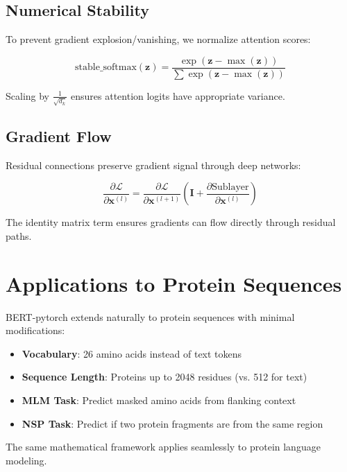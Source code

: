 \documentclass[11pt,a4paper]{article}
\begin{document}
\subsection{Numerical Stability}

To prevent gradient explosion/vanishing, we normalize attention scores:

\begin{equation}
\text{stable\_softmax}(\mathbf{z}) = \frac{\exp(\mathbf{z} - \max(\mathbf{z}))}{\sum \exp(\mathbf{z} - \max(\mathbf{z}))}
\end{equation}

Scaling by $\frac{1}{\sqrt{d_k}}$ ensures attention logits have appropriate variance.

\subsection{Gradient Flow}

Residual connections preserve gradient signal through deep networks:

\begin{equation}
\frac{\partial \mathcal{L}}{\partial \mathbf{x}^{(l)}} = \frac{\partial \mathcal{L}}{\partial \mathbf{x}^{(l+1)}} \left(\mathbf{I} + \frac{\partial \text{Sublayer}}{\partial \mathbf{x}^{(l)}}\right)
\end{equation}

The identity matrix term ensures gradients can flow directly through residual paths.

\section{Applications to Protein Sequences}

BERT-pytorch extends naturally to protein sequences with minimal modifications:

\begin{itemize}
    \item \textbf{Vocabulary}: 26 amino acids instead of text tokens
    \item \textbf{Sequence Length}: Proteins up to 2048 residues (vs. 512 for text)
    \item \textbf{MLM Task}: Predict masked amino acids from flanking context
    \item \textbf{NSP Task}: Predict if two protein fragments are from the same region
\end{itemize}

The same mathematical framework applies seamlessly to protein language modeling.
\end{document}
